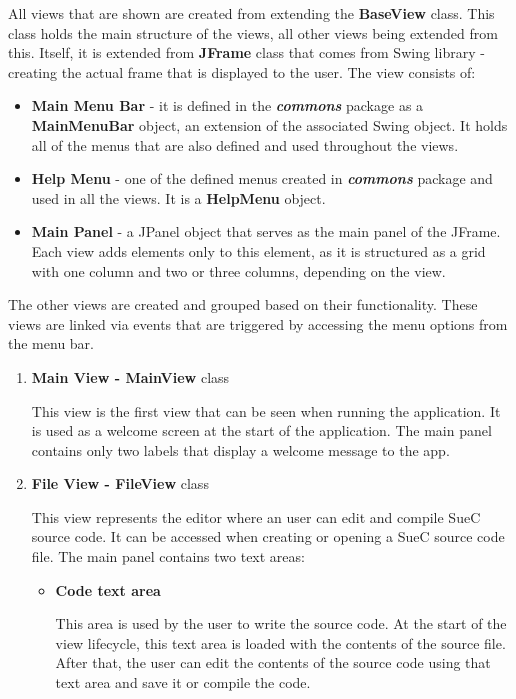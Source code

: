 \documentclass[12pt,a4paper,twoside]{report}
\begin{document}
\begin{enumerate}
All views that are shown are created from extending the \textbf {BaseView} class. This class holds the main structure of the views, all other views being extended from this. Itself, it is extended from \textbf{JFrame} class that comes from Swing library - creating the actual frame that is displayed to the user. The view consists of:
\begin{itemize}
 \item \textbf{Main Menu Bar} - it is defined in the \textbf{\textit{commons}} package as a \textbf{MainMenuBar} object, an extension of the associated Swing object. It holds all of the menus that are also defined and used throughout the views. 
 \item \textbf{Help Menu} - one of the defined menus created  in \textbf{\textit{commons}} package and used in all the views. It is a \textbf{HelpMenu} object. 
 \item \textbf{Main Panel} - a JPanel object that serves as the main panel of the JFrame. Each view adds elements only to this element, as it is structured as a grid with one column and two or three columns, depending on the view.
\end{itemize}

The other views are created and grouped based on their functionality. These views are linked via events that are triggered by accessing the menu options from the menu bar.  

\begin{enumerate}
 \item \textbf{Main View - MainView} class
 
 This view is the first view that can be seen when running the application. It is used as a welcome screen at the start of the application. The main panel contains only two labels that display a welcome message to the app.
 
 \item \textbf{File View - FileView} class
 
 This view represents the editor where an user can edit and compile SueC source code. It can be accessed when creating or opening a SueC source code file. The main panel contains two text areas:
 \begin {itemize}
  \item \textbf{Code text area}
  
  This area is used by the user to write the source code. At the start of the view lifecycle, this text area is loaded with the contents of the source file. After that, the user can edit the contents of the source code using that text area and save it or compile the code.
  

\end{itemize}
\end{enumerate}
\end{enumerate}
\end{document}
